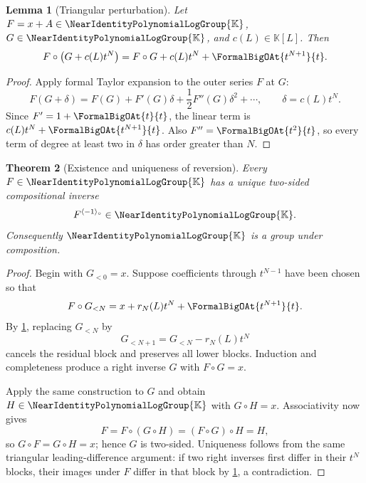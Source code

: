 \documentclass[11pt]{article}
\theoremstyle{pltheorem}
\newtheorem{theorem}{Theorem}[section]
\newtheorem{lemma}[theorem]{Lemma}
\newcommand{\K}{\mathbb K}
\newcommand{\Gnear}{\NearIdentityPolynomialLogGroup{\K}}
\newcommand{\rev}{\langle-1\rangle_{\circ}}
\newcommand{\compose}{\mathbin{\circ}}
\begin{document}
\begin{lemma}[Triangular perturbation]\label{lem:triangular-perturbation}
Let \(F=x+A\in\Gnear\), \(G\in\Gnear\), and \(c(L)\in\K[L]\).  Then
\begin{equation}\label{eq:triangular-perturbation}
 F\compose\bigl(G+c(L)t^N\bigr)
 =F\compose G+c(L)t^N+\FormalBigOAt{t^{N+1}}{t}.
\end{equation}
\end{lemma}

\begin{proof}
Apply formal Taylor expansion to the outer series \(F\) at \(G\):
\[
 F(G+\delta)=F(G)+F'(G)\delta+\frac12F''(G)\delta^2+\cdots,
 \qquad \delta=c(L)t^N.
\]
Since \(F'=1+\FormalBigOAt{t}{t}\), the linear term is
\(c(L)t^N+\FormalBigOAt{t^{N+1}}{t}\).  Also \(F''=\FormalBigOAt{t^2}{t}\), so every term of degree at least two in \(\delta\) has order greater than \(N\).
\end{proof}

\begin{theorem}[Existence and uniqueness of reversion]\label{thm:reversion-existence}
Every \(F\in\Gnear\) has a unique two-sided compositional inverse
\begin{equation}\label{eq:inverse-in-Gnear}
 F^{\rev}\in\Gnear.
\end{equation}
Consequently \(\Gnear\) is a group under composition.
\end{theorem}

\begin{proof}
Begin with \(G_{<0}=x\).  Suppose coefficients through \(t^{N-1}\) have been chosen so that
\begin{equation}\label{eq:reversion-residual-N}
 F\compose G_{<N}=x+r_N(L)t^N+\FormalBigOAt{t^{N+1}}{t}.
\end{equation}
By \cref{lem:triangular-perturbation}, replacing \(G_{<N}\) by
\[
 G_{<N+1}=G_{<N}-r_N(L)t^N
\]
cancels the residual block and preserves all lower blocks.  Induction and completeness produce a right inverse \(G\) with \(F\compose G=x\).

Apply the same construction to \(G\) and obtain \(H\in\Gnear\) with
\(G\compose H=x\).  Associativity now gives
\[
 F=F\compose(G\compose H)=(F\compose G)\compose H=H,
\]
so \(G\compose F=G\compose H=x\); hence \(G\) is two-sided.  Uniqueness follows from the same triangular leading-difference argument: if two right inverses first differ in their \(t^N\) blocks, their images under \(F\) differ in that block by \cref{lem:triangular-perturbation}, a contradiction.
\end{proof}
\end{document}
